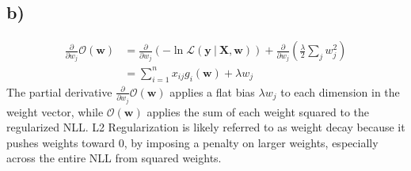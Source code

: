 \documentclass{article}
\renewcommand{\vec}[1]{%
	\mathbf{#1}%
}
\newcommand{\gv}{%
	\:|\:
}
\begin{document}
	\subsection*{b)}
	\begin{align*}
		\frac{\partial}{\partial w_j}\mathcal{O}(\vec{w}) &= \frac{\partial}{\partial w_j}(-\ln\mathcal{L}(\vec{y}\gv\vec{X},\vec{w})) + \frac{\partial}{\partial w_j}(\frac{\lambda}{2}\sum_j w_j^2)\\
		&= \boxed{ \sum_{i=1}^n x_{ij}g_i(\vec{w}) + \lambda w_j }
	\end{align*}
	The partial derivative $\frac{\partial}{\partial w_j}\mathcal{O}(\vec{w})$ applies a flat bias $\lambda w_j$ to each dimension in the weight vector, while $\mathcal{O}(\vec{w})$ applies the sum of each weight squared to the regularized NLL. L2 Regularization is likely referred to as weight decay because it pushes weights toward 0, by imposing a penalty on larger weights, especially across the entire NLL from squared weights.
	
	
	
\end{document}

